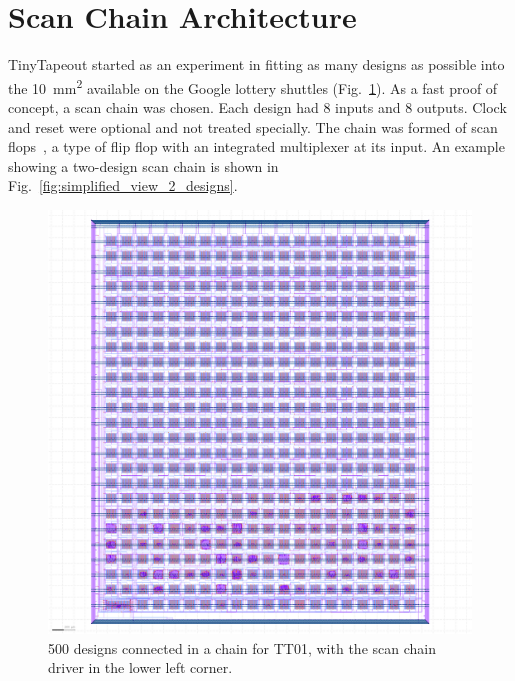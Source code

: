 \section{Scan Chain Architecture}
\label{sec:scanchain_arch}

TinyTapeout started as an experiment in fitting as many designs as possible into the \qty{10}{\milli\meter\squared} available on the Google lottery shuttles (Fig.~\ref{fig:500_designs_chain_TT01}).
As a fast proof of concept, a scan chain was chosen.
Each design had 8 inputs and 8 outputs.
Clock and reset were optional and not treated specially. The chain was formed of scan flops~\cite{skywaterpdk}, a type of flip flop with an integrated multiplexer at its input. An example showing a two-design scan chain is shown in Fig.~\ref{fig:simplified_view_2_designs}.

\begin{figure}[!t]
\centering
\includegraphics[width=1\columnwidth]{./Figs/tt01_whole_die.png}
\caption{500 designs connected in a chain for TT01, with the scan chain driver in the lower left corner.}
\label{fig:500_designs_chain_TT01}
\end{figure}

